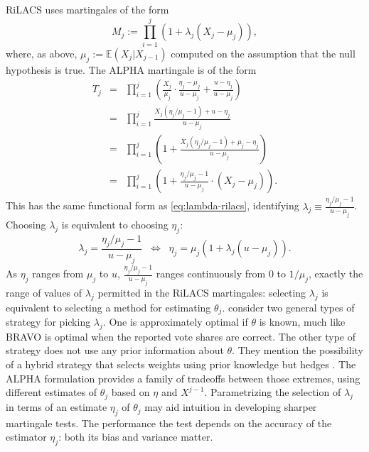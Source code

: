 \documentclass[12pt,runningheads]{llncs}
\newcommand{\EE}{\mathbb{E}}
\begin{document}
{RiLACS \cite{waudby-smithEtal21} uses martingales of the form
\begin{equation} \label{eq:lambda-rilacs}
M_j := \prod_{i=1}^j (1 + \lambda_j (X_j- \mu_j)),
\end{equation}
where, as above, $\mu_j := \EE(X_j | X_{j-1})$ computed on the assumption that the null hypothesis is true.
The ALPHA martingale is of the form
\begin{eqnarray} \label{eq:lambda-form}
T_j &=& \prod_{i=1}^j \left ( \frac{X_j}{\mu_j} \cdot \frac{\eta_j-\mu_j}{u-\mu_j} + \frac{u-\eta_j}{u-\mu_j} \right ) \nonumber \\
&=& \prod_{i=1}^j \frac{X_j (\eta_j/\mu_j -1) + u - \eta_j}{u-\mu_j} \nonumber \\
&=& \prod_{i=1}^j \left ( 1 + \frac{X_j (\eta_j/\mu_j -1) + \mu_j - \eta_j}{u-\mu_j} \right ) \nonumber \\
&=&  \prod_{i=1}^j \left ( 1 + \frac{\eta_j/\mu_j -1}{u-\mu_j} \cdot (X_j - \mu_j) \right ).
\end{eqnarray}
This has the same functional form as \ref{eq:lambda-rilacs},  identifying $\lambda_j \equiv \frac{\eta_j/\mu_j -1}{u-\mu_j}$.
Choosing $\lambda_j$ is equivalent to choosing $\eta_j$:
\begin{equation}
\lambda_j = \frac{\eta_j/\mu_j -1}{u-\mu_j} \;\; \Longleftrightarrow \;\; \eta_j = \mu_j \left ( 1 + \lambda_j (u-\mu_j) \right ).
\end{equation}
As $\eta_j$ ranges from $\mu_j$ to $u$, $\frac{\eta_j/\mu_j -1}{u-\mu_j}$ ranges continuously from
0 to $1/\mu_j$, exactly the range of values of $\lambda_j$ permitted in the RiLACS martingales:
selecting $\lambda_j$ is equivalent to selecting a method for estimating $\theta_j$.
\cite{waudby-smithEtal21} consider two general types of strategy for picking $\lambda_j$.
One is approximately optimal if $\theta$ is known, much like BRAVO is optimal 
when the reported vote shares are correct.
The other type of strategy does not use any prior information about $\theta$.
They mention the possibility of a hybrid strategy that selects weights using prior knowledge
but hedges \cite[Sec. 3]{waudby-smithEtal21}.
The ALPHA formulation provides a family of tradeoffs between those extremes, using different estimates
of $\theta_j$ based on $\eta$ and $X^{j-1}$.
Parametrizing the selection of $\lambda_j$ in terms of an estimate $\eta_j$ of $\theta_j$ may aid intuition in developing
sharper martingale tests.
The performance the test depends on the accuracy of the estimator $\eta_j$: both its bias and variance matter. 

}
\end{document}
